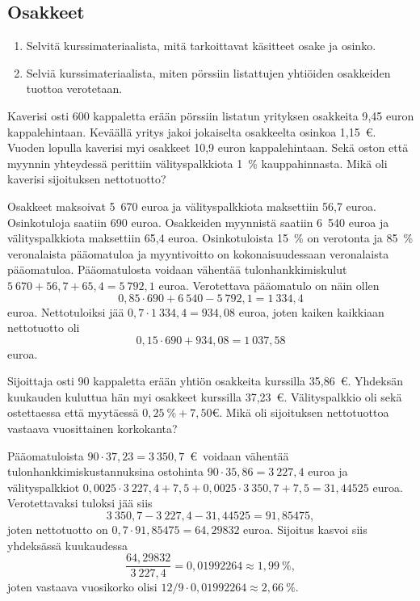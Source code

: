 \documentclass{article}\usepackage[]{graphicx}\usepackage[]{color}
\begin{document}
\subsection*{Osakkeet}

\begin{enumerate}
  \item Selvitä kurssimateriaalista, mitä tarkoittavat käsitteet osake ja osinko.
  \item Selviä kurssimateriaalista, miten pörssiin listattujen yhtiöiden osakkeiden tuottoa verotetaan.
\end{enumerate}
 
\begin{question} 
    Kaverisi osti 600 kappaletta erään pörssiin listatun yrityksen osakkeita 9{,}45 euron kappalehintaan. Keväällä yritys jakoi jokaiselta osakkeelta osinkoa 1{,}15~\euro. Vuoden lopulla kaverisi myi osakkeet 10{,}9 euron kappalehintaan. Sekä oston että myynnin yhteydessä perittiin välityspalkkiota 1~\% kauppahinnasta. Mikä oli kaverisi sijoituksen nettotuotto?
\end{question}
\begin{solution}
    Osakkeet maksoivat 5~670 euroa ja välityspalkkiota maksettiin 56{,}7 euroa. Osinkotuloja saatiin 690 euroa. Osakkeiden myynnistä saatiin 6~540 euroa ja välityspalkkiota maksettiin 65{,}4 euroa. 
    Osinkotuloista 15~\% on verotonta ja 85~\% veronalaista pääomatuloa ja myyntivoitto on kokonaisuudessaan veronalaista pääomatuloa. Pääomatulosta voidaan vähentää tulonhankkimiskulut \(5~670 + 56{,}7 +65{,}4 = 5~792{,}1\) euroa. Verotettava pääomatulo on näin ollen
    \[
        0,85\cdot690 + 6~540 - 5~792{,}1 = 1~334{,}4
    \]
    euroa. Nettotuloiksi jää \(0,7\cdot1~334{,}4 = 934{,}08\) euroa, joten kaiken kaikkiaan nettotuotto oli
    \[
        0,15\cdot690 + 934{,}08 = 1~037{,}58
    \]
    euroa. 
\end{solution}

\begin{question}
    Sijoittaja osti 90 kappaletta erään yhtiön osakkeita kurssilla 35{,}86~\euro. Yhdeksän kuukauden kuluttua hän myi osakkeet kurssilla 37{,}23~\euro. Välityspalkkio oli sekä ostettaessa että myytäessä $0{,}25\ \%  + 7{,}50 \euro$. Mikä oli sijoituksen nettotuottoa vastaava vuosittainen korkokanta?
\end{question}
\begin{solution}
    Pääomatuloista \(90\cdot37{,}23 = 3~350{,}7\)~\euro\ voidaan vähentää tulonhankkimiskustannuksina ostohinta \(90\cdot35{,}86 = 3~227{,}4\) euroa ja välityspalkkiot \(0,0025\cdot3~227{,}4 + 7,5 + 0,0025\cdot3~350{,}7 + 7,5 = 31{,}44525\) euroa. Verotettavaksi tuloksi jää siis 
    \[
        3~350{,}7 - 3~227{,}4 - 31{,}44525 = 91{,}85475,
    \]
    joten nettotuotto on \(0,7\cdot91{,}85475 = 64{,}29832\) euroa. Sijoitus kasvoi siis yhdeksässä kuukaudessa
    \[
        \frac{64{,}29832}{3~227{,}4} = 0{,}01992264 \approx 1{,}99~\%,
    \]
    joten vastaava vuosikorko olisi \(12/9\cdot0{,}01992264\approx 2{,}66~\%\).
\end{solution}
\end{document}
